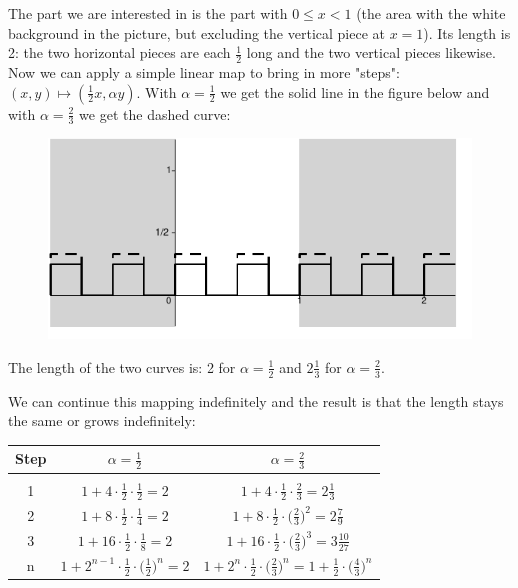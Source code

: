 \documentclass[onecolumn]{article}
\begin{document}
The part we are interested in is the part with \(0 \leq x < 1\) (the area
with the white background in the picture, but excluding the vertical piece at
\(x = 1\)). Its length is 2: the two horizontal pieces are each \(\frac{1}{2}\)
long and the two vertical pieces likewise. Now we can apply a simple linear map
to bring in more "steps": \((x,y) \mapsto (\frac{1}{2}x,\alpha y)\). With
\(\alpha = \frac{1}{2}\) we get the solid line in the figure below and with
\(\alpha = \frac{2}{3}\) we get the dashed curve:
\begin{figure}[H]
\begin{center}
\includegraphics{simple-curve2.pdf}
\label{SimpleCurve1}
\end{center}
\end{figure}

The length of the two curves is: 2 for \(\alpha = \frac{1}{2}\) and
\(2 \frac{1}{3}\) for \(\alpha = \frac{2}{3}\).

We can continue this mapping indefinitely and the result is that the length
stays the same or grows indefinitely:
\begin{table}[H]
\center
\begin{tabular}{ccc}
Step & \(\alpha = \frac{1}{2}\) & \(\alpha = \frac{2}{3}\)                        \\
\hline
\vspace{0.1\baselineskip} \\
1    & \(1 + 4 \cdot \frac{1}{2} \cdot \frac{1}{2} = 2\)     & \(1 + 4 \cdot \frac{1}{2} \cdot \frac{2}{3} = 2 \frac{1}{3}                   \) \\
2    & \(1 + 8 \cdot \frac{1}{2} \cdot \frac{1}{4} = 2\)     & \(1 + 8 \cdot \frac{1}{2} \cdot \bigl( \frac{2}{3} \bigr)^2 = 2 \frac{7}{9}    \) \\
3    & \(1 + 16 \cdot \frac{1}{2} \cdot \frac{1}{8} = 2\)   & \(1 + 16 \cdot \frac{1}{2} \cdot \bigl( \frac{2}{3} \bigr)^3 = 3 \frac{10}{27} \) \\
n    & \(1 + 2^{n-1} \cdot \frac{1}{2} \cdot \bigl( \frac{1}{2} \bigr)^n = 2\) & \(1 + 2^n \cdot \frac{1}{2} \cdot \bigl( \frac{2}{3} \bigr)^n = 1 + \frac{1}{2} \cdot \bigl( \frac{4}{3} \bigr)^n \)  \\
\hline
\end{tabular}
\end{table}
\end{document}
